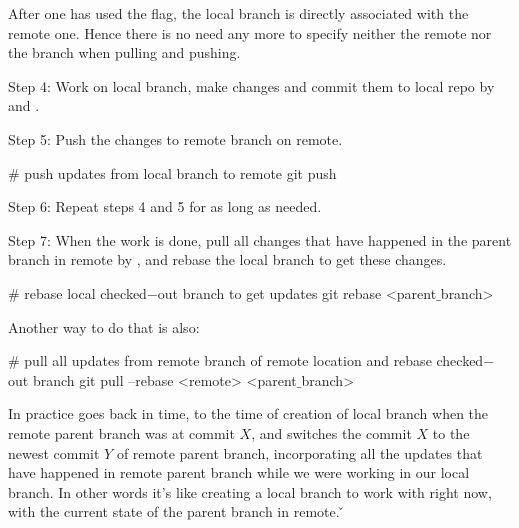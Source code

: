After one has used the  flag, the local branch is directly associated with the remote one. Hence there is
no need any more to specify neither the remote nor the branch when pulling and pushing.
\item Step 4: Work on local branch, make changes and commit them to local repo by  and .
\item Step 5: Push the changes to remote branch on remote.

\begin{bash}
# push updates from local branch to remote
git push
\end{bash}

\item Step 6: Repeat steps 4 and 5 for as long as needed.
\item Step 7: When the work is done, pull all changes that have happened in the parent branch in remote by , and rebase the local branch to get these changes.

\begin{bash}
# rebase local checked$-$out branch to get updates
git rebase <parent$\_$branch>
\end{bash}

Another way to do that is also:

\begin{bash}
# pull all updates from remote branch of remote location and rebase checked$-$out branch
git pull --rebase <remote> <parent$\_$branch>
\end{bash}

In practice  goes back in time, to the time of creation of local branch when the remote parent
branch was at commit $X$, and switches the commit $X$ to the newest commit $Y$ of remote parent branch, incorporating
all the updates that have happened in remote parent branch while we were working in our local branch. In other words
it’s like creating a local branch to work with right now, with the current state of the parent branch in remote. \v

